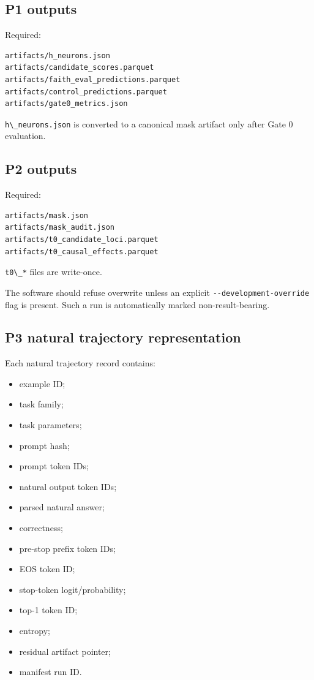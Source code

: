 \subsection{P1 outputs}\label{p1-outputs}

Required:

\begin{lstlisting}
artifacts/h_neurons.json
artifacts/candidate_scores.parquet
artifacts/faith_eval_predictions.parquet
artifacts/control_predictions.parquet
artifacts/gate0_metrics.json
\end{lstlisting}

\passthrough{\lstinline!h\_neurons.json!} is converted to a canonical mask artifact only after Gate 0 evaluation.

\subsection{P2 outputs}\label{p2-outputs}

Required:

\begin{lstlisting}
artifacts/mask.json
artifacts/mask_audit.json
artifacts/t0_candidate_loci.parquet
artifacts/t0_causal_effects.parquet
\end{lstlisting}

\passthrough{\lstinline!t0\_*!} files are write-once.

The software should refuse overwrite unless an explicit \passthrough{\lstinline!--development-override!} flag is present. Such a run is automatically marked non-result-bearing.

\subsection{P3 natural trajectory representation}\label{p3-natural-trajectory-representation}

Each natural trajectory record contains:

\begin{itemize}
\tightlist
\item
  example ID;
\item
  task family;
\item
  task parameters;
\item
  prompt hash;
\item
  prompt token IDs;
\item
  natural output token IDs;
\item
  parsed natural answer;
\item
  correctness;
\item
  pre-stop prefix token IDs;
\item
  EOS token ID;
\item
  stop-token logit/probability;
\item
  top-1 token ID;
\item
  entropy;
\item
  residual artifact pointer;
\item
  manifest run ID.
\end{itemize}

